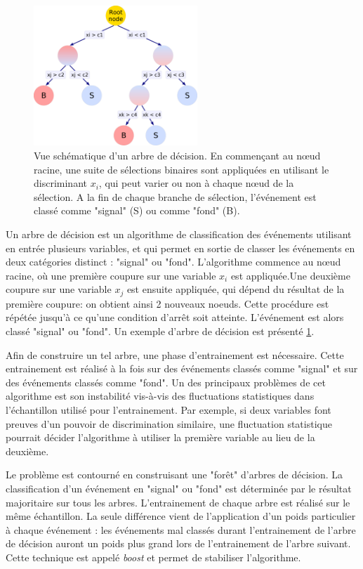 \begin{figure}[tbp] \centering
    \includegraphics[width=0.55\textwidth]{chapitre6/figs/BDT.pdf}
    \caption{Vue schématique d'un arbre de décision. En commençant au nœud racine, une suite de sélections binaires sont appliquées en utilisant le discriminant $x_i$, qui peut varier ou non à chaque nœud de la sélection. A la fin de chaque branche de sélection, l'événement est classé comme "signal" (S) ou comme "fond" (B).}
    \label{fig:bdt}
\end{figure}

Un arbre de décision est un algorithme de classification des événements utilisant en entrée plusieurs variables, et qui permet en sortie de classer les événements en deux catégories distinct : "signal" ou "fond". L'algorithme commence au nœud racine, où une première coupure sur une variable $x_i$ est appliquée.Une deuxième coupure sur une variable $x_j$ est ensuite appliquée, qui dépend du résultat de la première coupure: on obtient ainsi 2 nouveaux noeuds. Cette procédure est répétée jusqu'à ce qu'une condition d'arrêt soit atteinte. L'événement est alors classé "signal" ou "fond". Un exemple d'arbre de décision est présenté \cref{fig:bdt}.

Afin de construire un tel arbre, une phase d'entrainement est nécessaire. Cette entrainement est réalisé à la fois sur des événements classés comme "signal" et sur des événements classés comme "fond". Un des principaux problèmes de cet algorithme est son instabilité vis-à-vis des fluctuations statistiques dans l'échantillon utilisé pour l'entrainement. Par exemple, si deux variables font preuves d'un pouvoir de discrimination similaire, une fluctuation statistique pourrait décider l'algorithme à utiliser la première variable au lieu de la deuxième.

Le problème est contourné en construisant une "forêt" d'arbres de décision. La classification d'un événement en "signal" ou "fond" est déterminée par le résultat majoritaire sur tous les arbres. L'entrainement de chaque arbre est réalisé sur le même échantillon. La seule différence vient de l'application d'un poids particulier à chaque événement : les événements mal classés durant l'entrainement de l'arbre de décision auront un poids plus grand lors de l'entrainement de l'arbre suivant. Cette technique est appelé \emph{boost} \citep{Freund1997119} et permet de stabiliser l'algorithme.

